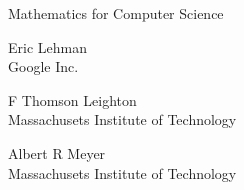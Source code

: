 \thispagestyle{empty}

\begin{center}
\begin{minipage}{4.5in}
\begin{center}
\rule{0in}{2in}
{\huge Mathematics for Computer Science}\\

\Stamp


\vspace{1in}
{\LARGE Eric Lehman}\\
{\large Google Inc.}

\vspace{0.3in}
{\LARGE F Thomson Leighton}\\
{\large Massachusets Institute of Technology}

\vspace{0.3in}
{\LARGE Albert R Meyer}\\
{\large Massachusets Institute of Technology}

\end{center}

\end{minipage}
\end{center}
\coursecopyright

\tableofcontents


\listoffigures

\endinput
